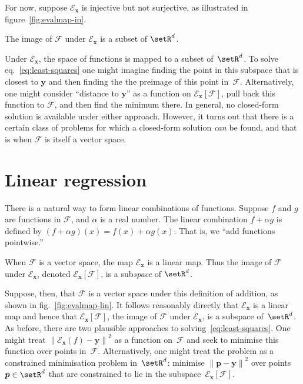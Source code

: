 \documentclass[10pt, a4paper]{article}
\newcommand{\evalmap}{\mathcal{E}_{\bm{x}}}
\begin{document}
For now, suppose $\mathcal{E}_{\bm{x}}$ is injective but not surjective, as
illustrated in figure~\ref{fig:evalmap-in}.
\begin{marginfigure}
  \begin{center}
  \end{center}
  \caption{The image of $\mathcal{F}$ under $\mathcal{E}_{\bm{x}}$ is a subset of
    $\setR^d$.\label{fig:evalmap-in}}
\end{marginfigure}
Under $\mathcal{E}_{\bm{x}}$, the space of functions is mapped to a subset
of~$\setR^d$. To solve eq.~\eqref{eq:least-squares} one might imagine
finding the point in this subspace that is closest to $\bm{y}$ and
then finding the the preimage of this point in~$\mathcal{F}$. Alternatively, one
might consider “distance to $\bm{y}$” as a function on
$\mathcal{E}_{\bm{x}}[\mathcal{F}]$, pull back this function to
$\mathcal{F}$, and then find the minimum there. In general, no closed-form
solution is available under either approach. However, it turns out
that there is a certain class of problems for which a closed-form
solution \emph{can} be found, and that is when $\mathcal{F}$ is itself a vector
space.

\section{Linear regression}

There is a natural way to form linear combinations of
functions. Suppose $f$ and $g$ are functions in $\mathcal{F}$, and
$\alpha$ is a real number. The linear combination $f+\alpha g$ is defined by
$(f+\alpha g)(x) = f(x)+\alpha g(x)$. That is, we “add functions pointwise.”

\begin{marginfigure}
  \begin{center}
  \end{center}
  \caption{When $\mathcal{F}$ is a vector space, the map
    $\mathcal{E}_{\bm{x}}$ is a linear map. Thus the image of
    $\mathcal{F}$ under $\mathcal{E}_{\bm{x}}$, denoted
    $\mathcal{E}_{\bm{x}}[\mathcal{F}]$, is a sub\emph{space} of
    $\setR^d$.\label{fig:evalmap-lin}}
\end{marginfigure}
Suppose, then, that $\mathcal{F}$ is a vector space under this definition of
addition, as shown in fig.~\ref{fig:evalmap-lin}. It follows
reasonably directly that $\mathcal{E}_{\bm{x}}$ is a linear map and hence that
$\mathcal{E}_{\bm{x}}[\mathcal{F}]$, the image of $\mathcal{F}$ under
$\mathcal{E}_{\bm{x}}$, is a subspace of~$\setR^d$. As before, there are two
plausible approaches to solving~\eqref{eq:least-squares}. One might
treat ${\lVert \evalmap(f)-\bm{y}\rVert}^2$ as a function on~$\mathcal{F}$ and
seek to minimise this function over points in~$\mathcal{F}$. Alternatively, one
might treat the problem as a constrained minimisation problem
in~$\setR^d$: minimise ${\lVert \bm{p}-\bm{y}\rVert}^2$ over points
$\bm{p}\in\setR^d$ that are constrained to lie in the
subspace~$\evalmap[\mathcal{F}]$.
\end{document}
